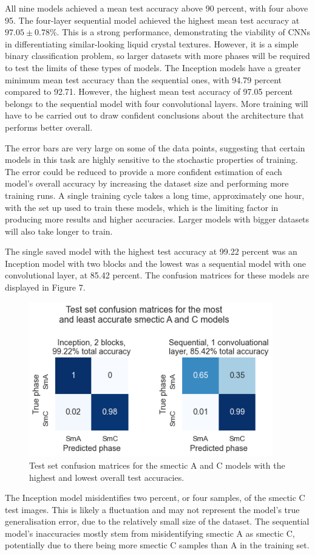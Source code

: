 \documentclass[12pt]{article}
\begin{document}
All nine models achieved a mean test accuracy above 90 percent, with four above 95. The four-layer sequential model achieved the highest mean test accuracy at $97.05\pm0.78$\%. This is a strong performance, demonstrating the viability of CNNs in differentiating similar-looking liquid crystal textures. However, it is a simple binary classification problem, so larger datasets with more phases will be required to test the limits of these types of models. The Inception models have a greater minimum mean test accuracy than the sequential ones, with 94.79 percent compared to 92.71. However, the highest mean test accuracy of 97.05 percent belongs to the sequential model with four convolutional layers. More training will have to be carried out to draw confident conclusions about the architecture that performs better overall.

The error bars are very large on some of the data points, suggesting that certain models in this task are highly sensitive to the stochastic properties of training. The error could be reduced to provide a more confident estimation of each model's overall accuracy by increasing the dataset size and performing more training runs. A single training cycle takes a long time, approximately one hour, with the set up used to train these models, which is the limiting factor in producing more results and higher accuracies. Larger models with bigger datasets will also take longer to train.

The single saved model with the highest test accuracy at 99.22 percent was an Inception model with two blocks and the lowest was a sequential model with one convolutional layer, at 85.42 percent. The confusion matrices for these models are displayed in Figure 7.
\begin{figure}[!ht]
	\centering
    \includegraphics[width=4.174in]{images/confusion_matrix_2.png}
    \caption{Test set confusion matrices for the smectic A and C models with the highest and lowest overall test accuracies.}
\end{figure} 
The Inception model misidentifies two percent, or four samples, of the smectic C test images. This is likely a fluctuation and may not represent the model's true generalisation error, due to the relatively small size of the dataset. The sequential model's inaccuracies mostly stem from misidentifying smectic A as smectic C, potentially due to there being more smectic C samples than A in the training set. 
\end{document}
